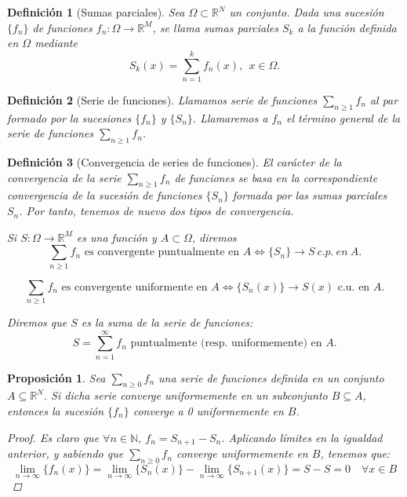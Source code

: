 \documentclass[11pt, a4paper]{article}
\newcommand{\N}{\mathbb{N}}
\newcommand{\fn}{\{f_n\}}
\theoremstyle{theorem-style}
\newtheorem*{nprop}{Proposición}
\theoremstyle{definition-style}
\newtheorem*{ndef}{Definición}
\theoremstyle{remark-style}
\theoremstyle{example-style}
\begin{document}
\begin{ndef}[Sumas parciales]
Sea $\Omega\subset \mathbb R^N$ un conjunto. 
Dada una sucesi\'on $\{f_n \}$ de funciones $f_n : \Omega \longrightarrow \mathbb R^M$, se llama sumas parciales $S_k$ a la funci\'on definida en $\Omega$ mediante
 \[ 
 S_k (x) = \sum_{n=1}^{k} f_n(x),\ \ x\in\Omega.
 \] 
\end{ndef}

\begin{ndef}[Serie de funciones]
Llamamos serie  de funciones $\sum_{n\geq 1} f_n$ al par formado por la sucesiones  $\{ f_n \}$ y $\{S_n\}$. Llamaremos a $f_n$ el t\'ermino general de la serie de funciones $\displaystyle\sum_{n\geq 1} f_n$.
\end{ndef}

\begin{ndef}[Convergencia de series de funciones]
El car\'acter de la convergencia de la serie $\sum_{n\geq 1} f_n$ de funciones se basa en la correspondiente convergencia de la sucesi\'on de funciones $\{S_n\}$ formada por las sumas parciales $S_n$. Por tanto, tenemos de nuevo dos tipos de convergencia.

Si $S:\Omega\longrightarrow \mathbb R^M$ es una funci\'on y $A\subset \Omega$, diremos 
$$\sum_{n\geq 1} f_n  \mbox{ es convergente puntualmente en } A \Leftrightarrow \{S_n \} \longrightarrow S\ c.p.\ en\ A.$$

$$\sum_{n\geq 1} f_n  \mbox{ es convergente uniformente en }A \Leftrightarrow \{S_n(x)\} \longrightarrow S(x) \mbox{ c.u. en }A.$$ 

Diremos que $S$ es la suma de la serie de funciones: 
\[
S=\displaystyle \sum_{n=1}^{\infty} f_n \mbox{ puntualmente (resp. uniformemente) en $A$.}
\]
\end{ndef}

\begin{nprop}
	Sea $\sum_{n \ge 0} f_n$ una serie de funciones definida en un conjunto $A \subseteq \mathbb{R}^N$. Si dicha serie converge uniformemente en un subconjunto $B \subseteq A$, entonces la sucesión $\fn$ converge a 0 uniformemente en $B$.
	
\begin{proof}
Es claro que $\forall n \in \N,\ f_n = S_{n+1} - S_n$. Aplicando límites en la igualdad anterior, y sabiendo que $\sum_{n\ge 0} f_n$ converge uniformemente en $B$, tenemos que: $$\lim_{n \to \infty} \{f_n(x)\} = \lim_{n \to \infty} \{S_n(x)\} - \lim_{n \to \infty} \{S_{n + 1}(x)\} = S - S = 0\quad \forall x \in B$$ \end{proof}
\end{nprop}
\end{document}
